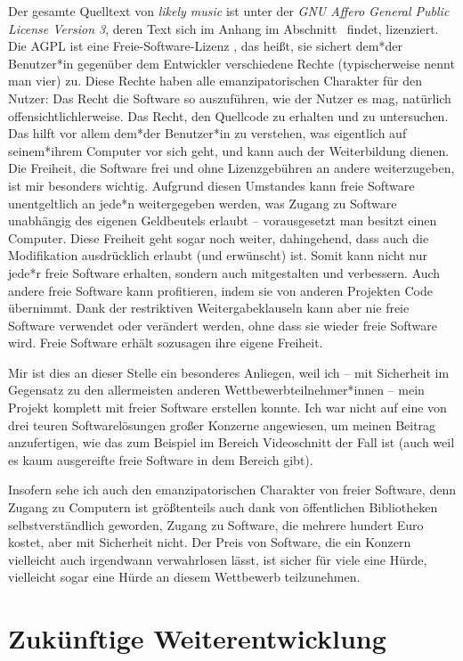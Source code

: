 \documentclass[a4paper,twocolumn]{article}
\begin{document}
Der gesamte Quelltext von {\it likely music} ist unter der
{\it GNU Affero General Public License Version 3}, deren Text sich im Anhang
im Abschnitt~ findet, lizenziert. Die AGPL ist eine
Freie-Software-Lizenz \cite{gnu_free_software}, das heißt, sie sichert dem*der
Benutzer*in gegenüber dem Entwickler verschiedene Rechte (typischerweise nennt man
vier) zu. Diese Rechte haben alle emanzipatorischen Charakter für den Nutzer:
Das Recht die Software so auszuführen, wie der Nutzer es mag, natürlich
offensichtlichlerweise. Das Recht, den Quellcode zu erhalten und zu untersuchen.
Das hilft vor allem dem*der Benutzer*in zu verstehen, was eigentlich auf
seinem*ihrem Computer vor sich geht, und kann auch der Weiterbildung dienen. Die
Freiheit, die Software frei und ohne Lizenzgebühren an andere weiterzugeben, ist
mir besonders wichtig. Aufgrund diesen Umstandes kann freie Software
unentgeltlich an jede*n weitergegeben werden, was Zugang zu Software unabhängig
des eigenen Geldbeutels erlaubt -- vorausgesetzt man besitzt einen Computer.
Diese Freiheit geht sogar noch weiter, dahingehend, dass auch die Modifikation
ausdrücklich erlaubt (und erwünscht) ist. Somit kann nicht nur jede*r freie
Software erhalten, sondern auch mitgestalten und verbessern. Auch andere freie
Software kann profitieren, indem sie von anderen Projekten Code übernimmt. Dank
der restriktiven Weitergabeklauseln kann aber nie freie Software verwendet oder
verändert werden, ohne dass sie wieder freie Software wird. Freie Software
erhält sozusagen ihre eigene Freiheit.

Mir ist dies an dieser Stelle ein besonderes Anliegen, weil ich -- mit
Sicherheit im Gegensatz zu den allermeisten anderen Wettbewerbteilnehmer*innen
-- mein Projekt komplett mit freier Software erstellen konnte. Ich war nicht auf
eine von drei teuren Softwarelösungen großer Konzerne angewiesen, um meinen
Beitrag anzufertigen, wie das zum Beispiel im Bereich Videoschnitt der Fall ist
(auch weil es kaum ausgereifte freie Software in dem Bereich gibt).

Insofern sehe ich auch den emanzipatorischen Charakter von freier Software, denn
Zugang zu Computern ist größtenteils auch dank von öffentlichen Bibliotheken
selbstverständlich geworden, Zugang zu Software, die mehrere hundert Euro
kostet, aber mit Sicherheit nicht. Der Preis von Software, die ein Konzern
vielleicht auch irgendwann verwahrlosen lässt, ist sicher für viele eine Hürde,
vielleicht sogar eine Hürde an diesem Wettbewerb teilzunehmen.

\section*{Zukünftige Weiterentwicklung}
\end{document}
